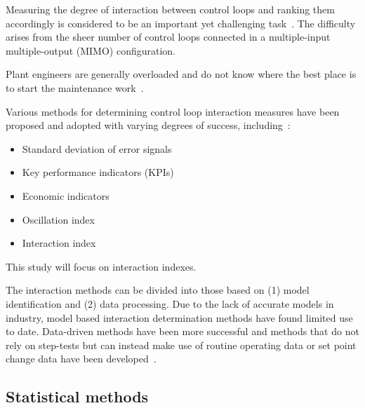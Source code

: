 Measuring the degree of interaction between control loops and ranking them accordingly is considered to be an important yet challenging task~\citep{Rahman2011}.
The difficulty arises from the sheer number of control loops connected in a multiple-input multiple-output (MIMO) configuration.

Plant engineers are generally overloaded and do not know where the best place is to start the maintenance work~\citep{Rahman2011}.

Various methods for determining control loop interaction measures have been proposed and adopted with varying degrees of success, including~\citep{Rahman2011}: %

\begin{itemize}
  \item Standard deviation of error signals
  \item Key performance indicators (KPIs) 
  \item Economic indicators
  \item Oscillation index
  \item Interaction index
\end{itemize}

This study will focus on interaction indexes. %

The interaction methods can be divided into those based on (1) model identification and (2) data processing.
Due to the lack of accurate models in industry, model based interaction determination methods have found limited use to date.
Data-driven methods have been more successful and methods that do not rely on step-tests but can instead make use of routine operating data or set point change data have been developed~\citep{Rahman2011}. %

\subsection{Statistical methods}

